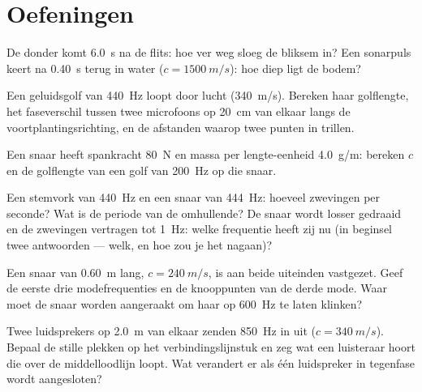 \section{Oefeningen}

\begin{exercise}[$\star$]\label{exo:b1:wave-propagation:1}
De donder komt \qty{6.0}{s} na de flits: hoe ver weg sloeg de bliksem in? Een
sonarpuls keert na \qty{0.40}{s} terug in water ($c = \qty{1500}{m/s}$):
hoe diep ligt de bodem?
\end{exercise}

\begin{exercise}[$\star$]\label{exo:b1:wave-propagation:2}
Een geluidsgolf van \qty{440}{Hz} loopt door lucht (\qty{340}{m/s}). Bereken
haar golflengte, het faseverschil tussen twee microfoons op \qty{20}{cm} van
elkaar langs de voortplantingsrichting, en de afstanden waarop twee punten
in  trillen.
\end{exercise}

\begin{exercise}[$\star$]\label{exo:b1:wave-propagation:3}
Een snaar heeft spankracht \qty{80}{N} en massa per lengte-eenheid
\qty{4.0}{g/m}: bereken $c$ en de golflengte van een golf van \qty{200}{Hz}
op die snaar.
\end{exercise}

\begin{exercise}[$\star$]\label{exo:b1:wave-propagation:4}
Een stemvork van \qty{440}{Hz} en een snaar van \qty{444}{Hz}: hoeveel
zwevingen per seconde? Wat is de periode van de omhullende? De snaar
wordt losser gedraaid en de zwevingen vertragen tot \qty{1}{Hz}: welke
frequentie heeft zij nu (in beginsel twee antwoorden --- welk, en hoe zou je
het nagaan)?
\end{exercise}

\begin{exercise}[$\star\star$]\label{exo:b1:wave-propagation:5}
Een snaar van \qty{0.60}{m} lang, $c = \qty{240}{m/s}$, is aan beide
uiteinden vastgezet. Geef de eerste drie modefrequenties en de knooppunten van
de derde mode. Waar moet de snaar worden aangeraakt om haar op
\qty{600}{Hz} te laten klinken?
\end{exercise}

\begin{exercise}[$\star\star$]\label{exo:b1:wave-propagation:6}
Twee luidsprekers op \qty{2.0}{m} van elkaar zenden \qty{850}{Hz} in  uit
($c = \qty{340}{m/s}$). Bepaal de stille plekken op het verbindingslijnstuk
en zeg wat een luisteraar hoort die over de middelloodlijn loopt. Wat
verandert er als één luidspreker in tegenfase wordt aangesloten?
\end{exercise}


